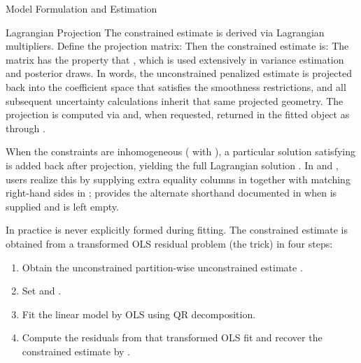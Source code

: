 \begin{Section}{Model Formulation and Estimation}
%
\begin{SubSection}{Lagrangian Projection}
The constrained estimate is derived via Lagrangian multipliers. Define the
 projection matrix:
Then the constrained estimate is:
The matrix  has the property that
, which is
used extensively in variance estimation and posterior draws. In words, the
unconstrained penalized estimate is projected back into the coefficient space
that satisfies the smoothness restrictions, and all subsequent uncertainty
calculations inherit that same projected geometry.
The projection is computed via  and, when requested,
returned in the fitted object as  through .

When the constraints are inhomogeneous
( with
), a particular solution
 satisfying
 is added back
after projection, yielding the full Lagrangian solution
.
In  and , users realize
this by supplying extra equality columns in 
together with matching right-hand sides in ;
 provides the alternate shorthand documented in
 when  is supplied and
 is left empty.

In practice  is never explicitly formed during fitting.
The constrained estimate is obtained from a transformed OLS residual problem (the
 trick) in four steps:
\begin{enumerate}

\item{} Obtain the unconstrained partition-wise
unconstrained estimate \eqn{\hat{\boldsymbol{\beta}}}{}.
\item{} Set  and
.
\item{} Fit the linear model 
by OLS using QR decomposition.
\item{} Compute the residuals  from that transformed OLS
fit and recover the constrained estimate by
.


\end{enumerate}
\end{SubSection}
\end{Section}
